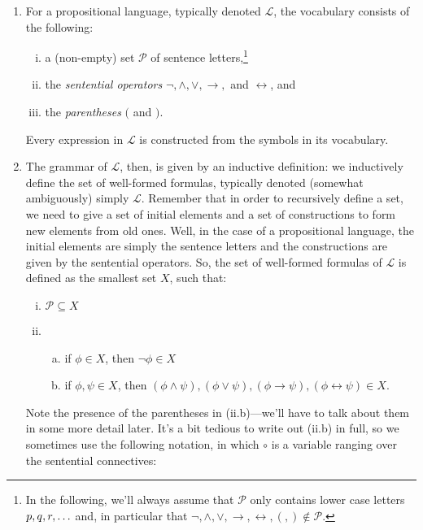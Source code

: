 \begin{enumerate}[\thesection.1]
		\item For a propositional language, typically denoted $\mathcal{L}$, the vocabulary consists of the following:		
		\begin{enumerate}[(i)]
		
			\item a (non-empty) set $\mathcal{P}$ of sentence letters,\footnote{In the following, we'll always assume that $\mathcal{P}$ only contains lower case letters $p,q,r, \mathellipsis$ and, in particular that $\neg,\land,\lor,\to,\leftrightarrow,(,)\notin\mathcal{P}$.}
			
			\item the \emph{sentential operators} $\neg,\land,\lor,\to,$ and $\leftrightarrow$, and 
			
			\item the \emph{parentheses} $($ and $)$.
		
		\end{enumerate}
		Every expression in $\mathcal{L}$ is constructed from the symbols in its vocabulary.
		
		\item The grammar of $\mathcal{L}$, then, is given by an inductive definition: we inductively define the set of well-formed formulas, typically denoted (somewhat ambiguously) simply $\mathcal{L}$. Remember that in order to recursively define a set, we need to give a set of initial elements and a set of constructions to form new elements from old ones. Well, in the case of a propositional language, the initial elements are simply the sentence letters and the constructions are given by the sentential operators. So, the set of well-formed formulas of $\mathcal{L}$ is defined as the smallest set $X$, such that:
		\begin{enumerate}[(i)]
		
			\item $\mathcal{P}\subseteq X$
			
			\item \begin{enumerate}[(a)]

					\item if $\phi\in X$, then $\neg \phi\in X$
					
					\item if $\phi,\psi\in X$, then $(\phi\land\psi), (\phi\lor\psi),(\phi\to\psi),(\phi\leftrightarrow\psi)\in X$.
		
				\end{enumerate}		
		
		\end{enumerate}
Note the presence of the parentheses in (ii.b)---we'll have to talk about them in some more detail later. It's a bit tedious to write out (ii.b) in full, so we sometimes use the following notation, in which $\circ$ is a variable ranging over the sentential connectives:
\begin{enumerate}[(i)]
		\setcounter{enumii}{1}
			

\end{enumerate}
\end{enumerate}
